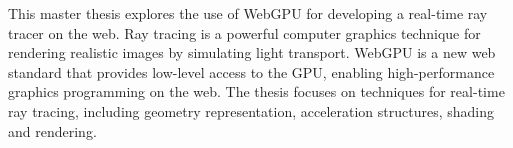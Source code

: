 
This master thesis explores the use of WebGPU for developing a real-time ray tracer on the web. Ray tracing is a powerful computer graphics technique for rendering realistic images by simulating light transport. WebGPU is a new web standard that provides low-level access to the GPU, enabling high-performance graphics programming on the web.
The thesis focuses on techniques for real-time ray tracing, including geometry representation, acceleration structures, shading and rendering.